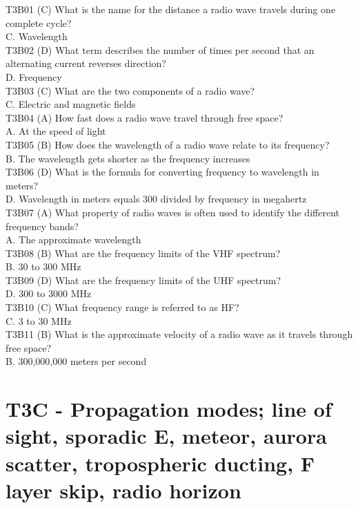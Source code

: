\documentclass[12pt,letterpaper]{report}
\begin{document}
T3B01 (C) What is the name for the distance a radio wave travels during one complete cycle?\\
C. Wavelength\\

T3B02 (D) What term describes the number of times per second that an alternating current reverses direction?\\
D. Frequency\\

T3B03 (C) What are the two components of a radio wave?\\
C. Electric and magnetic fields\\

T3B04 (A) How fast does a radio wave travel through free space?\\
A. At the speed of light\\

T3B05 (B) How does the wavelength of a radio wave relate to its frequency?\\
B. The wavelength gets shorter as the frequency increases\\

T3B06 (D) What is the formula for converting frequency to wavelength in meters?\\
D. Wavelength in meters equals 300 divided by frequency in megahertz\\

T3B07 (A) What property of radio waves is often used to identify the different frequency bands?\\
A. The approximate wavelength\\

T3B08 (B) What are the frequency limits of the VHF spectrum?\\
B. 30 to 300 MHz\\

T3B09 (D) What are the frequency limits of the UHF spectrum?\\
D. 300 to 3000 MHz\\

T3B10 (C) What frequency range is referred to as HF?\\
C. 3 to 30 MHz\\

T3B11 (B) What is the approximate velocity of a radio wave as it travels through free space?\\
B. 300,000,000 meters per second\\

\section{T3C - Propagation modes; line of sight, sporadic E, meteor, aurora scatter, tropospheric ducting, F layer skip, radio horizon}
\end{document}

